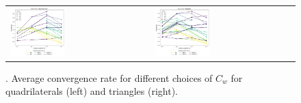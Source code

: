 \begin{figure}[h!]
\centering
\begin{tabular}{p{} p{}}
	\vspace{0pt} 
	\includegraphics[width=0.4\textwidth]{../figs/parametric/advdiff_2D/ord_quarteroni2_2_4}
	&
	\vspace{0pt} 
	\includegraphics[width=0.4\textwidth]{../figs/parametric/advdiff_2D/ord_quarteroni2_2_3}
\end{tabular}
\caption{. Average convergence rate for different choices of $C_w$ for 
quadrilaterals (left) and triangles (right).}
\label{fig:orders_quarteroni2}
\end{figure}

